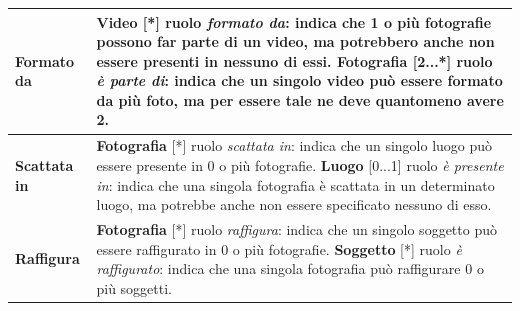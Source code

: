 \documentclass[a4paper]{article}
\begin{document}
	\begin{tabular}{p{90pt}p{180pt}}
		\textbf{Formato da} &
		\textbf{Video} [*] ruolo
		\emph{formato da}: indica che 1 o più fotografie
		possono far parte di un video, ma potrebbero anche
		non essere presenti in nessuno di essi.
		\newline
		\textbf{Fotografia} [2...*] ruolo \emph{è parte di}:
		indica
		che un singolo video può essere formato da più foto,
		ma per essere tale ne deve quantomeno avere 2.
		\\
		\hline
		
		\hline
		\textbf{Scattata in} &
		\textbf{Fotografia} [*] ruolo
		\emph{scattata in}: indica che un singolo luogo può
		essere presente in 0 o più fotografie.
		\newline
		\textbf{Luogo} [0...1] ruolo \emph{è presente in}:
		indica
		che una singola fotografia è scattata in un
		determinato luogo, ma potrebbe anche non essere
		specificato nessuno di esso.
		\\
		\hline
		
		\textbf{Raffigura} &
		\textbf{Fotografia} [*] ruolo
		\emph{raffigura}: indica
		che un singolo soggetto può essere raffigurato in
		0 o più fotografie.
		\newline
		\textbf{Soggetto} [*] ruolo \emph{è raffigurato}:
		indica
		che una singola fotografia può raffigurare 0 o più
		soggetti.		
		\\
		\hline
	\end{tabular}
	
	
	
	\vspace{35pt}
\end{document}
